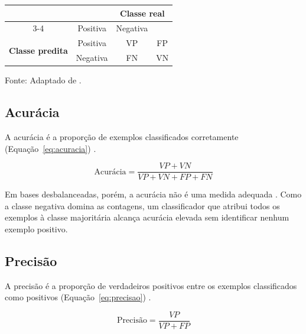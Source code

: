 \documentclass{uflamon}          %
\begin{document}
\begin{quadro}[htb]
    \centering
    \caption{Matriz de confusão.}
    \label{qua:confusao}
    \vspace{2mm}
    \begin{tabular}{|c|c|c|c|}
        \hline
        \multicolumn{2}{|c|}{\multirow{2}{*}{}} & \multicolumn{2}{c|}{\textbf{Classe real}} \\
        \cline{3-4}
        \multicolumn{2}{|c|}{} & Positiva & Negativa \\
        \hline
        \multirow{2}{*}{\textbf{Classe predita}} & Positiva & VP & FP \\
        \cline{2-4}
         & Negativa & FN & VN \\
        \hline
    \end{tabular}
    \par\vspace{2mm}
    {\small Fonte: Adaptado de .}
\end{quadro}

\subsection{Acurácia}

A acurácia é a proporção de exemplos classificados corretamente (Equação~\ref{eq:acuracia}) \cite{fawcett2006}.

\begin{equation}
    \text{Acurácia} = \frac{VP + VN}{VP + VN + FP + FN}
    \label{eq:acuracia}
\end{equation}

Em bases desbalanceadas, porém, a acurácia não é uma medida adequada \cite{chawla2002}. Como a classe negativa domina as contagens, um classificador que atribui todos os exemplos à classe majoritária alcança acurácia elevada sem identificar nenhum exemplo positivo.

\subsection{Precisão}

A precisão é a proporção de verdadeiros positivos entre os exemplos classificados como positivos (Equação~\ref{eq:precisao}) \cite{fawcett2006}.

\begin{equation}
    \text{Precisão} = \frac{VP}{VP + FP}
    \label{eq:precisao}
\end{equation}
\end{document}
